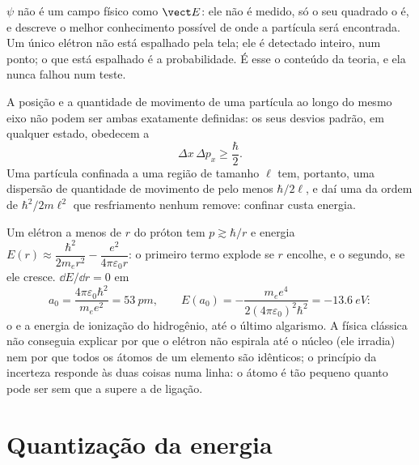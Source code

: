 \begin{remark}\label{rem:b1:quantum-introduction:whatwaves}
$\psi$ não é um campo físico como $\vect E$: ele não é medido, só
o seu quadrado o é, e descreve o melhor conhecimento possível de onde
a partícula será encontrada. Um único elétron não está espalhado pela
tela; ele é detectado inteiro, num ponto; o que está espalhado é a
probabilidade. É esse o conteúdo da teoria, e ela nunca falhou
num teste.
\end{remark}

\begin{theorem}\label{thm:b1:quantum-introduction:heisenberg}
A posição e a quantidade de movimento de uma partícula ao longo do mesmo eixo não podem
ser ambas exatamente definidas: os seus desvios padrão, em qualquer estado, obedecem a
\[
\Delta x\,\Delta p_x \geq \frac{\hbar}{2} .
\]
Uma partícula confinada a uma região de tamanho $\ell$ tem, portanto, uma dispersão de
quantidade de movimento de pelo menos $\hbar/2\ell$, e daí uma  da ordem de
$\hbar^2/2m\ell^2$ que resfriamento nenhum remove: confinar custa energia.
\end{theorem}
\admitted

\begin{example}\label{ex:b1:quantum-introduction:hsize}
Um elétron a menos de $r$ do próton tem $p \gtrsim \hbar/r$ e energia
$E(r) \approx \dfrac{\hbar^2}{2m_er^2} - \dfrac{e^2}{4\pi\varepsilon_0r}$: o primeiro
termo explode se $r$ encolhe, e o segundo, se ele cresce. $\dd E/\dd r = 0$ em
\[
a_0 = \frac{4\pi\varepsilon_0\hbar^2}{m_ee^2} = \qty{53}{pm} , \qquad
E(a_0) = -\frac{m_ee^4}{2(4\pi\varepsilon_0)^2\hbar^2} = \qty{-13.6}{eV} :
\]
o \emph{} e a energia de ionização do hidrogênio, até o
último algarismo. A física clássica não conseguia explicar por que o elétron não
espirala até o núcleo (ele irradia) nem por que todos os átomos de um
elemento são idênticos; o princípio da incerteza responde às duas coisas numa
linha: o átomo é tão pequeno quanto pode ser sem que a 
supere a de ligação.
\end{example}

\section{Quantização da energia}

